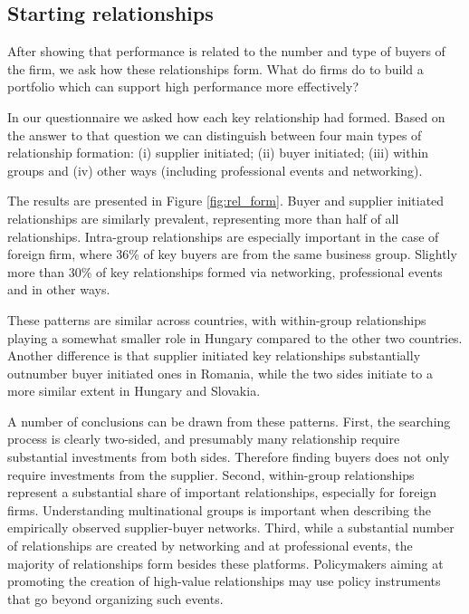 \documentclass[final, dvipsnames, authoryear,12pt]{elsarticle}
\begin{document}
\subsection{Starting relationships}

After showing that performance is related to the number and type of buyers of the firm, we ask how these relationships form. What do firms do to build a portfolio which can support high performance more effectively?

In our questionnaire we asked how each key relationship had formed. Based on the answer to that question we can distinguish between four main types of relationship formation: (i) supplier initiated; (ii) buyer initiated; (iii) within groups and (iv) other ways (including professional events and networking). 

The results are presented in Figure \ref{fig:rel_form}. Buyer and supplier initiated relationships are similarly prevalent, representing more than half of all relationships. Intra-group relationships are especially important in the case of foreign firm, where 36\% of key buyers are from the same business group. Slightly more than 30\% of key relationships formed via networking, professional events and in other ways. 

These patterns are similar across countries, with within-group relationships playing a somewhat smaller role in Hungary compared to the other two countries. Another difference is that supplier initiated key relationships substantially outnumber buyer initiated ones in Romania, while the two sides initiate to a more similar extent in Hungary and Slovakia.

A number of conclusions can be drawn from these patterns. First, the searching process is clearly two-sided, and presumably many relationship require substantial investments from both sides. Therefore finding buyers does not only require investments from the supplier. Second, within-group relationships represent a substantial share of important relationships, especially for foreign firms. Understanding multinational groups is important when describing the empirically observed supplier-buyer networks. Third, while a substantial number of relationships are created by networking and at professional events, the majority of relationships form besides these platforms. Policymakers aiming at promoting the creation of high-value relationships may use policy instruments that go beyond organizing such events. 
\end{document}
